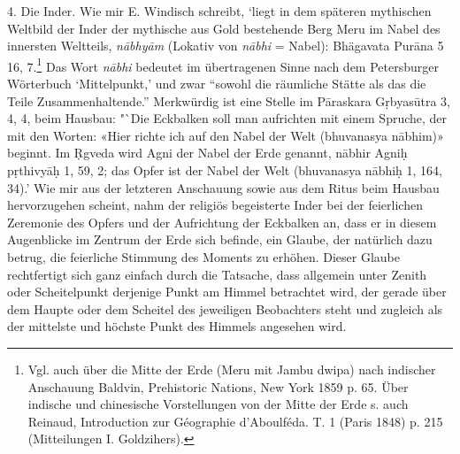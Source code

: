 \documentclass[a4paper, 11pt, oneside]{article}
\begin{document}
4. Die Inder. Wie mir E. Windisch schreibt, `liegt in dem späteren mythischen Weltbild der Inder der mythische aus Gold bestehende Berg Meru im Nabel des innersten Weltteils, \emph{nābhyām} (Lokativ von \emph{nābhi} = Nabel): Bhägavata Purāna 5 16, 7.\footnote{Vgl. auch über die Mitte der Erde (Meru mit Jambu dwipa) nach indischer Anschauung Baldvin, Prehistoric Nations, New York 1859 p. 65. Über indische und chinesische Vorstellungen von der Mitte der Erde s. auch Reinaud, Introduction zur Géographie d'Aboulféda. T. 1 (Paris 1848) p. 215 (Mitteilungen I. Goldzihers).} Das Wort \emph{nābhi} bedeutet im übertragenen Sinne nach dem Petersburger Wörterbuch `Mittelpunkt,' und zwar "`sowohl die räumliche Stätte als das die Teile Zusammenhaltende."' Merkwürdig ist eine Stelle im Pāraskara Gṛbyasūtra 3, 4, 4, beim Hausbau: "`Die Eckbalken soll man aufrichten mit einem Spruche, der mit den Worten: «Hier richte ich auf den Nabel der Welt (bhuvanasya nābhim)» beginnt. Im \d{R}gveda wird Agni der Nabel der Erde genannt, nābhir Agniḥ pṛthivyāḥ 1, 59, 2; das Opfer ist der Nabel der Welt (bhuvanasya nābhiḥ 1, 164, 34).' Wie mir aus der letzteren Anschauung sowie aus dem Ritus beim Hausbau hervorzugehen scheint, nahm der religiös begeisterte Inder bei der feierlichen Zeremonie des Opfers und der Aufrichtung der Eckbalken an, dass er in diesem Augenblicke im Zentrum der Erde sich befinde, ein Glaube, der natürlich dazu betrug, die feierliche Stimmung des Moments zu erhöhen. Dieser Glaube rechtfertigt sich ganz einfach durch die Tatsache, dass allgemein unter Zenith oder Scheitelpunkt derjenige Punkt am Himmel betrachtet wird, der gerade über dem Haupte oder dem Scheitel des jeweiligen Beobachters steht und zugleich als der mittelste und höchste Punkt des Himmels angesehen wird.
\end{document}
